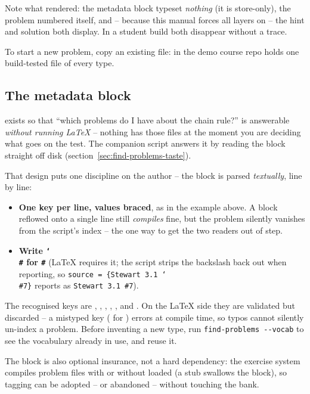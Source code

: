 Note what rendered: the metadata block typeset \emph{nothing} (it is
store-only), the problem numbered itself, and -- because this manual forces all
layers on -- the hint and solution both display. In a student build both
disappear without a trace.

To start a new problem, copy an existing file: 
in the demo course repo holds one build-tested file of every type.

\subsection{The metadata block}\label{sec:problemmeta}

 exists so that ``which problems do I have about the chain
rule?'' is answerable \emph{without running LaTeX} -- nothing has 
those files at the moment you are deciding what goes on the test. The
companion script  answers it by reading the block straight
off disk (section~\ref{sec:find-problems-taste}).

That design puts one discipline on the author -- the block is parsed
\emph{textually}, line by line:

\begin{itemize}
  \item \textbf{One key per line, values braced}, as in the example above. A
    block reflowed onto a single line still \emph{compiles} fine, but the
    problem silently vanishes from the script's index -- the one way to get the
    two readers out of step.
  \item \textbf{Write \texttt{\char`\\\#} for \texttt{\#}} (LaTeX requires it;
    the script strips the backslash back out when reporting, so
    \texttt{source = \{Stewart 3.1 \char`\\\#7\}} reports as
    \texttt{Stewart 3.1 \#7}).
\end{itemize}

The recognised keys are , , ,
, , and . On the LaTeX side they are validated
but discarded -- a mistyped key ( for ) errors at compile
time, so typos cannot silently un-index a problem. Before inventing a new type, run
\texttt{find-problems -{}-vocab} to see the vocabulary already in use, and reuse
it.

The block is also optional insurance, not a hard dependency: the exercise
system compiles problem files with or without  loaded (a
stub swallows the block), so tagging can be adopted -- or abandoned --
without touching the bank.

